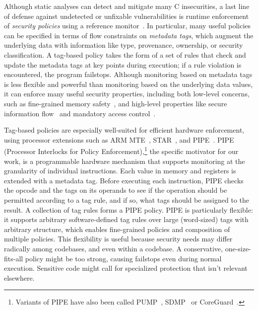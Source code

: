 \documentclass{llncs}
\begin{document}
Although static
analyses can detect and mitigate many C insecurities, a last line of
defense against undetected or unfixable vulnerabilities is runtime
enforcement of {\em security policies} using a reference
monitor~\cite{Anderson72:PlanningStudy}. In particular, 
many useful policies can be specified in terms of flow constraints on 
\emph{metadata tags}, which augment the underlying data with information like type, provenance,
ownership, or security classification. A tag-based policy takes the form of a set of
rules that check and update the metadata tags at key points during execution; if a rule violation is
encountered, the program failstops. 
Although monitoring based on metadata tags is less flexible and powerful than monitoring based on the
underlying data values, it can enforce many useful security properties, including
both low-level concerns, such as fine-grained memory safety~\cite{Witchel02:MondrianMem}, and high-level
properties like secure information flow~\cite{Denning76:SFIlattice} and mandatory access control~\cite{USDoD85:OrangeBook}. 

Tag-based policies are especially well-suited for efficient hardware enforcement, using 
processor extensions such as ARM MTE~\cite{arm-mte},
STAR~\cite{Gollapudi+23}, and
PIPE~\cite{Dhawan+15,Azevedo+16,Azevedo+15}.  PIPE (Processor
Interlocks for Policy Enforcement),\footnote{ Variants of PIPE have
also been called PUMP~\cite{Dhawan+14,Dhawan+15},
SDMP~\cite{Dover16,RoesslerD18} or CoreGuard~\cite{Dover20}.} 
the specific motivator for our work, 
is a programmable hardware mechanism that supports monitoring 
at the granularity of individual instructions. 
Each value in memory and registers
is extended with a metadata tag. Before executing each instruction,
PIPE checks the opcode and the tags on its operands to see if the operation 
should be permitted according to a tag rule, and if so, what tags should be 
assigned to the result. A collection of tag rules forms a PIPE policy.
PIPE is particularly flexible: it supports
arbitrary software-defined tag rules over large (word-sized) tags with arbitrary structure,
which enables fine-grained policies and composition of multiple policies. This flexibility 
is useful because security needs may differ radically among codebases,
and even within a codebase. A conservative, one-size-fits-all policy might be too strong,
causing failstops even during normal execution. Sensitive code might call for specialized
protection that isn't relevant elsewhere.
 
\end{document}
